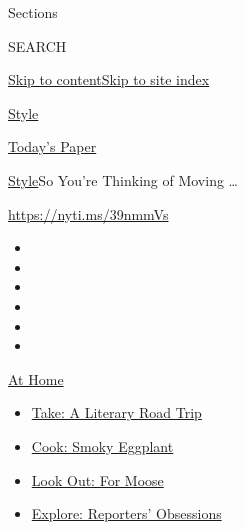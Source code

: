 Sections

SEARCH

\protect\hyperlink{site-content}{Skip to
content}\protect\hyperlink{site-index}{Skip to site index}

\href{https://www.nytimes3xbfgragh.onion/section/style}{Style}

\href{https://myaccount.nytimes3xbfgragh.onion/auth/login?response_type=cookie\&client_id=vi}{}

\href{https://www.nytimes3xbfgragh.onion/section/todayspaper}{Today's
Paper}

\href{/section/style}{Style}\textbar{}So You're Thinking of Moving
\ldots{}

\url{https://nyti.ms/39nmmVs}

\begin{itemize}
\item
\item
\item
\item
\item
\item
\end{itemize}

\href{https://www.nytimes3xbfgragh.onion/spotlight/at-home?action=click\&pgtype=Article\&state=default\&region=TOP_BANNER\&context=at_home_menu}{At
Home}

\begin{itemize}
\tightlist
\item
  \href{https://www.nytimes3xbfgragh.onion/2020/07/28/books/time-for-a-literary-road-trip.html?action=click\&pgtype=Article\&state=default\&region=TOP_BANNER\&context=at_home_menu}{Take:
  A Literary Road Trip}
\item
  \href{https://www.nytimes3xbfgragh.onion/2020/07/29/magazine/bored-with-your-home-cooking-some-smoky-eggplant-will-fix-that.html?action=click\&pgtype=Article\&state=default\&region=TOP_BANNER\&context=at_home_menu}{Cook:
  Smoky Eggplant}
\item
  \href{https://www.nytimes3xbfgragh.onion/2020/07/27/travel/moose-michigan-isle-royale.html?action=click\&pgtype=Article\&state=default\&region=TOP_BANNER\&context=at_home_menu}{Look
  Out: For Moose}
\item
  \href{https://www.nytimes3xbfgragh.onion/interactive/2020/at-home/even-more-reporters-editors-diaries-lists-recommendations.html?action=click\&pgtype=Article\&state=default\&region=TOP_BANNER\&context=at_home_menu}{Explore:
  Reporters' Obsessions}
\end{itemize}

